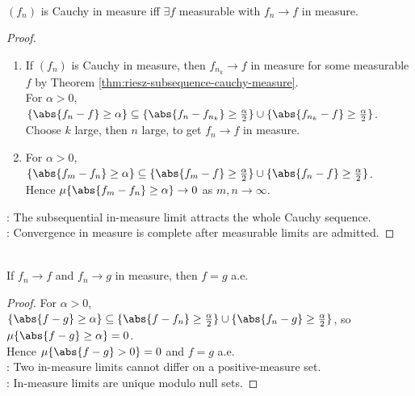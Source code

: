 \begin{corollary} \label{cor:cauchy-in-measure-completion} \\
$(f_n)$ is Cauchy in measure iff $\exists f$ measurable with $f_n\to f$ in measure.
\begin{proof}
\begin{enumerate}[label=\roman*.]
\setlength{\itemsep}{0pt}
\item[$(\Rightarrow)$] If $(f_n)$ is Cauchy in measure, then $f_{n_k}\to f$ in measure for some measurable $f$ by Theorem \ref{thm:riesz-subsequence-cauchy-measure}.\\
For $\alpha>0$, $\{\abs{f_n-f}\geq\alpha\}\subseteq\{\abs{f_n-f_{n_k}}\geq\frac{\alpha}{2}\}\cup\{\abs{f_{n_k}-f}\geq\frac{\alpha}{2}\}$.\\
Choose $k$ large, then $n$ large, to get $f_n\to f$ in measure.
\item[$(\Leftarrow)$] For $\alpha>0$, $\{\abs{f_m-f_n}\geq\alpha\}\subseteq\{\abs{f_m-f}\geq\frac{\alpha}{2}\}\cup\{\abs{f_n-f}\geq\frac{\alpha}{2}\}$.\\
Hence $\mu\{\abs{f_m-f_n}\geq\alpha\}\to0$ as $m,n\to\infty$.
\end{enumerate}
: The subsequential in-measure limit attracts the whole Cauchy sequence.\\
: Convergence in measure is complete after measurable limits are admitted.
\end{proof}
\end{corollary}

\begin{corollary} \label{cor:cauchy-in-measure-completion-uniqueness} \\
If $f_n\to f$ and $f_n\to g$ in measure, then $f=g$ a.e.
\begin{proof}
For $\alpha>0$, $\{\abs{f-g}\geq\alpha\}\subseteq\{\abs{f-f_n}\geq\frac{\alpha}{2}\}\cup\{\abs{f_n-g}\geq\frac{\alpha}{2}\}$, so $\mu\{\abs{f-g}\geq\alpha\}=0$.\\
Hence $\mu\{\abs{f-g}>0\}=0$ and $f=g$ a.e.\\
: Two in-measure limits cannot differ on a positive-measure set.\\
: In-measure limits are unique modulo null sets.
\end{proof}
\end{corollary}

